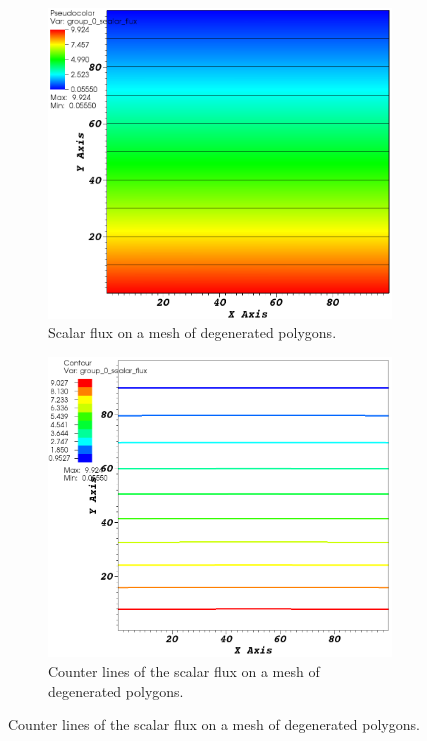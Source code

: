 \documentclass[preprint,10pt]{elsarticle}
\renewcommand{\(}{\left(}
\renewcommand{\)}{\right)}
\renewcommand{\[}{\left[}
\renewcommand{\]}{\right]}
\begin{document}
\begin{figure}[!htbp]
  \begin{subfigure}{0.45\textwidth}
    \centering
    \includegraphics[width=\textwidth]{no_dsa}
    \caption{Scalar flux on a mesh of degenerated polygons.}
    \label{fig_no_dsa}
  \end{subfigure}
  \begin{subfigure}{0.45\textwidth}
    \centering
    \includegraphics[width=\textwidth]{contour}
    \caption{Counter lines of the scalar flux on a mesh of degenerated polygons.}
    \label{fig_contour}
  \end{subfigure}
\end{figure}
\end{document}
